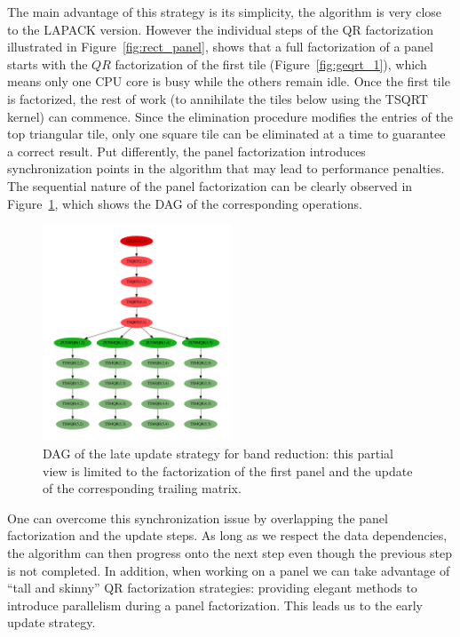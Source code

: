 The main advantage of this strategy is its simplicity,
the algorithm is very close to the LAPACK version. However the
individual steps of the QR factorization illustrated in
Figure~\ref{fig:rect_panel},
shows that a full factorization of a panel
starts with the $QR$ factorization of the first tile
(Figure~\ref{fig:geqrt_1}), which means only one CPU core is busy
while the others remain idle. Once the first tile is factorized, the
rest of work (to annihilate the tiles below using the TSQRT
kernel) can commence.
Since the elimination procedure modifies the entries of the
top triangular tile, only one square tile can be eliminated at a time
to guarantee a correct result.
Put differently,
the panel factorization introduces synchronization points
in the algorithm that
may lead to performance penalties.
The sequential nature of the panel factorization can be
clearly observed in Figure~\ref{fig:dag_panel},
which shows the DAG of the corresponding operations.

\begin{figure}
  \begin{center}
    \includegraphics[width=0.5\textwidth]{fig/dag}
  \end{center}
  \caption{DAG of the late update strategy for band reduction:
    this partial view is limited to the factorization of the first panel and
    the update of the corresponding trailing matrix.}
  \label{fig:dag_panel}
\end{figure}

One can overcome this synchronization issue by overlapping the panel
factorization and the update steps.
As long as we respect the data dependencies, the algorithm can then progress onto the next step even
though the previous step is not completed.
In addition, when working on a panel we can
take advantage of ``tall and skinny'' QR factorization
strategies:
providing elegant methods to introduce parallelism
during a panel factorization.
This leads us to the early update strategy.

